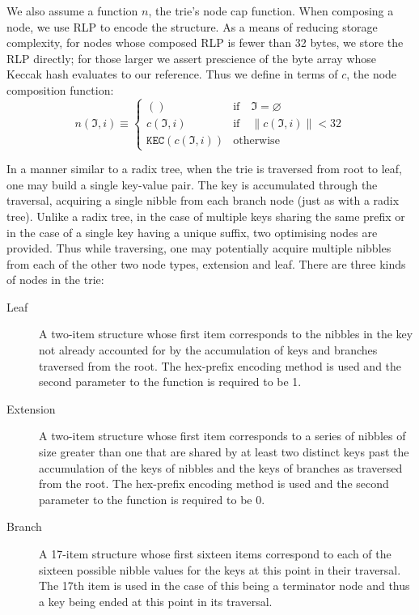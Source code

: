 \documentclass[9pt,oneside]{amsart}
\begin{document}
We also assume a function $n$, the trie's node cap function. When composing a node, we use RLP to encode the structure. As a means of reducing storage complexity, for nodes whose composed RLP is fewer than 32 bytes, we store the RLP directly; for those larger we assert prescience of the byte array whose Keccak hash evaluates to our reference. Thus we define in terms of $c$, the node composition function:
\begin{equation}
n(\mathfrak{I}, i) \equiv \begin{cases}
() & \text{if} \quad \mathfrak{I} = \varnothing \\
c(\mathfrak{I}, i) & \text{if} \quad \lVert c(\mathfrak{I}, i)\rVert < 32 \\
\texttt{KEC}(c(\mathfrak{I}, i)) & \text{otherwise}
\end{cases}
\end{equation}

In a manner similar to a radix tree, when the trie is traversed from root to leaf, one may build a single key-value pair. The key is accumulated through the traversal, acquiring a single nibble from each branch node (just as with a radix tree). Unlike a radix tree, in the case of multiple keys sharing the same prefix or in the case of a single key having a unique suffix, two optimising nodes are provided. Thus while traversing, one may potentially acquire multiple nibbles from each of the other two node types, extension and leaf. There are three kinds of nodes in the trie:
\begin{description}
\item[Leaf] A two-item structure whose first item corresponds to the nibbles in the key not already accounted for by the accumulation of keys and branches traversed from the root. The hex-prefix encoding method is used and the second parameter to the function is required to be 1.
\item[Extension] A two-item structure whose first item corresponds to a series of nibbles of size greater than one that are shared by at least two distinct keys past the accumulation of the keys of nibbles and the keys of branches as traversed from the root. The hex-prefix encoding method is used and the second parameter to the function is required to be 0.
\item[Branch] A 17-item structure whose first sixteen items correspond to each of the sixteen possible nibble values for the keys at this point in their traversal. The 17th item is used in the case of this being a terminator node and thus a key being ended at this point in its traversal.
\end{description}
\end{document}
